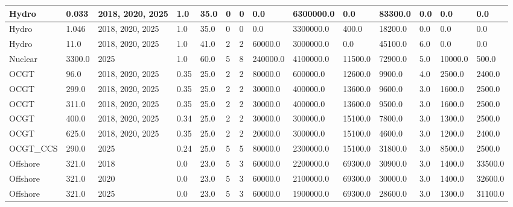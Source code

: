 \documentclass[sigconf]{acmart}
\begin{document}
\begin{table*}[]
\begin{tabular}{|l|l|l|l|l|l|l|l|l|l|l|l|l|l|}
		Hydro         & 0.033       & 2018, 2020, 2025 & 1.0    & 35.0 & 0     & 0     & 0.0      & 6300000.0 & 0.0      & 83300.0 & 0.0   & 0.0     & 0.0      \\ \hline
		Hydro         & 1.046       & 2018, 2020, 2025 & 1.0    & 35.0 & 0     & 0     & 0.0      & 3300000.0 & 400.0    & 18200.0 & 0.0   & 0.0     & 0.0      \\ \hline
		Hydro         & 11.0        & 2018, 2020, 2025 & 1.0    & 41.0 & 2     & 2     & 60000.0  & 3000000.0 & 0.0      & 45100.0 & 6.0   & 0.0     & 0.0      \\ \hline
		Nuclear       & 3300.0      & 2025             & 1.0    & 60.0 & 5     & 8     & 240000.0 & 4100000.0 & 11500.0  & 72900.0 & 5.0   & 10000.0 & 500.0    \\ \hline
		OCGT          & 96.0        & 2018, 2020, 2025 & 0.35   & 25.0 & 2     & 2     & 80000.0  & 600000.0  & 12600.0  & 9900.0  & 4.0   & 2500.0  & 2400.0   \\ \hline
		OCGT          & 299.0       & 2018, 2020, 2025 & 0.35   & 25.0 & 2     & 2     & 30000.0  & 400000.0  & 13600.0  & 9600.0  & 3.0   & 1600.0  & 2500.0   \\ \hline
		OCGT          & 311.0       & 2018, 2020, 2025 & 0.35   & 25.0 & 2     & 2     & 30000.0  & 400000.0  & 13600.0  & 9500.0  & 3.0   & 1600.0  & 2500.0   \\ \hline
		OCGT          & 400.0       & 2018, 2020, 2025 & 0.34   & 25.0 & 2     & 2     & 30000.0  & 300000.0  & 15100.0  & 7800.0  & 3.0   & 1300.0  & 2500.0   \\ \hline
		OCGT          & 625.0       & 2018, 2020, 2025 & 0.35   & 25.0 & 2     & 2     & 20000.0  & 300000.0  & 15100.0  & 4600.0  & 3.0   & 1200.0  & 2400.0   \\ \hline
		OCGT\_CCS     & 290.0       & 2025             & 0.24   & 25.0 & 5     & 5     & 80000.0  & 2300000.0 & 15100.0  & 31800.0 & 3.0   & 8500.0  & 2500.0   \\ \hline
		Offshore      & 321.0       & 2018             & 0.0    & 23.0 & 5     & 3     & 60000.0  & 2200000.0 & 69300.0  & 30900.0 & 3.0   & 1400.0  & 33500.0  \\ \hline
		Offshore      & 321.0       & 2020             & 0.0    & 23.0 & 5     & 3     & 60000.0  & 2100000.0 & 69300.0  & 30000.0 & 3.0   & 1400.0  & 32600.0  \\ \hline
		Offshore      & 321.0       & 2025             & 0.0    & 23.0 & 5     & 3     & 60000.0  & 1900000.0 & 69300.0  & 28600.0 & 3.0   & 1300.0  & 31100.0  \\ \hline

\end{tabular}
\end{table*}
\end{document}
